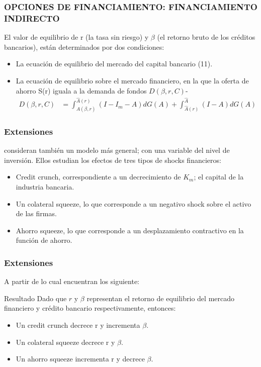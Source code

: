\begin{frame}
\frametitle{{\normalsize OPCIONES DE FINANCIAMIENTO: FINANCIAMIENTO INDIRECTO} {}}
El valor de equilibrio de r (la tasa sin riesgo) y $\beta $ (el retorno bruto de los créditos bancarios), están determinados por dos condiciones:
\begin{itemize}
	\item La ecuación de equilibrio del mercado del capital bancario (11).
	\item La ecuación de equilibrio sobre el mercado financiero, en la que la oferta de ahorro S(r) iguala a la demanda de fondos $D(\beta, r, C)$-
	\begin{align}
	D(\beta, r, C)&=\int_{A(\beta, r)}^{\hat{A}(r)}(I-I_{m}-A)dG(A)+\int_{\hat{A}(r)}^{\hat{A}}(I-A)dG(A)
	\end{align}   
	
\end{itemize}

\end{frame}



\begin{frame}
\frametitle{{\normalsize Extensiones} {}}
\cite{Tirole1997} consideran también un modelo más general; con una variable del nivel de inversión. Ellos estudian los efectos de tres tipos de shocks financieros:
\begin{itemize}
	\item Credit crunch, correspondiente a un decrecimiento de $K_{m}$; el capital de la industria bancaria.
	\item Un colateral squeeze, lo que corresponde a un negativo shock sobre el activo de las firmas.
	\item Ahorro squeeze, lo que corresponde a un desplazamiento contractivo en la función de ahorro.
\end{itemize}
\end{frame}

\begin{frame}
\frametitle{{\normalsize Extensiones} {}}

A partir de lo cual encuentran los siguiente:
\begin{block} {Resultado}
	Dado que $r$ y $\beta$ representan el retorno de equilibrio del mercado financiero y crédito bancario respectivamente, entonces:
	\begin{itemize}
		\item Un credit crunch decrece r y incrementa $\beta$.
		\item Un colateral squeeze decrece r y  $\beta$.
		\item Un ahorro squeeze incrementa r y decrece $\beta$.
	\end{itemize}  
\end{block}
\end{frame}